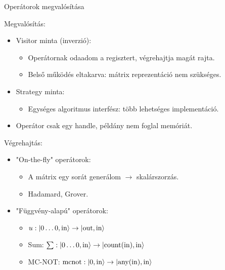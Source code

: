 \documentclass[aspectratio=169]{beamer}
\begin{document}
\begin{frame}{Operátorok megvalósítása}

Megvalósítás:

\begin{itemize}
    \item Visitor minta (inverzió):
    \begin{itemize}
        \item Operátornak odaadom a regisztert, végrehajtja magát rajta.
        \item Belső működés eltakarva: mátrix reprezentáció nem szükséges.
    \end{itemize}
    \item Strategy minta:
    \begin{itemize}
    \item Egységes algoritmus interfész: több lehetséges implementáció.
    \end{itemize}
    \item Operátor csak egy handle, példány nem foglal memóriát.
\end{itemize}

Végrehajtás:
\begin{itemize}
    \item "On-the-fly" operátorok:
    \begin{itemize}
        \item A mátrix egy sorát generálom $\rightarrow$ skalárszorzás.
        \item Hadamard, Grover.
    \end{itemize}
    \item "Függvény-alapú" operátorok:
    \begin{itemize}
        \item $u: \ket{0\dots{}0,\text{in}} \rightarrow \ket{\text{out},\text{in}}$
        \item Sum: $\sum: \ket{0\dots{}0,\text{in}} \rightarrow \ket{\text{count}(\text{in}),\text{in}}$
        \item MC-NOT: $\text{mcnot}: \ket{0,\text{in}} \rightarrow \ket{\text{any}(\text{in}),\text{in}}$
    \end{itemize}
\end{itemize}


\end{frame}
\end{document}

